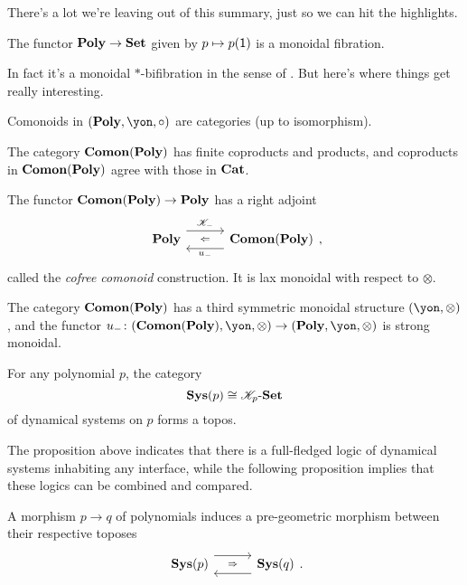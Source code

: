 \documentclass[Book-Poly]{subfiles}
\begin{document}
There's a lot we're leaving out of this summary, just so we can hit the highlights.

\begin{proposition}
The functor $\mathbf{Poly}\to\mathbf{Set}$ given by $p\mapsto p(\textsf{1})$ is a monoidal fibration.
\end{proposition}

In fact it's a monoidal $*$-bifibration in the sense of \cite{shulman2008framed}. But here's where things get really interesting.

\begin{proposition}\label{prop.ahman_uustalu1}
Comonoids in $(\poly,\yon,\circ)$ are categories (up to isomorphism).
\end{proposition}

\begin{proposition}
The category $\mathbf{Comon}(\mathbf{Poly})$ has finite coproducts and products, and coproducts in $\mathbf{Comon}(\mathbf{Poly})$ agree with those in $\mathbf{Cat}$.
\end{proposition}

\begin{proposition}
The functor $\mathbf{Comon}(\mathbf{Poly})\to\mathbf{Poly}$ has a right adjoint
\[
\adjr{\poly}{\com{K}_-}{u_-}{\comon},
\]
called the \emph{cofree comonoid} construction. It is lax monoidal with respect to $\otimes$.
\end{proposition}

\begin{proposition}
The category $\mathbf{Comon}(\mathbf{Poly})$ has a third symmetric monoidal structure $(\yon,\otimes)$, and the functor $u_-\colon(\comon,\yon,\otimes)\to(\poly,\yon,\otimes)$ is strong monoidal.
\end{proposition}



\begin{proposition}\label{prop.sysp[i]s_topos}
For any polynomial $p$, the category
\[\mathbf{Sys}(p)\cong\mathscr{K}_p\textnormal{-}\mathbf{Set}\]
of dynamical systems on $p$ forms a topos.
\end{proposition}

The proposition above indicates that there is a full-fledged logic of dynamical systems inhabiting any interface, while the following proposition implies that these logics can be combined and compared.

\begin{proposition}\label{prop.poly_map_pregeo_topos}
A morphism $p\to q$ of polynomials induces a pre-geometric morphism between their respective toposes
\[
\adj{\sys(p)}{}{}{\sys(q)}.
\]
\end{proposition}
\end{document}
